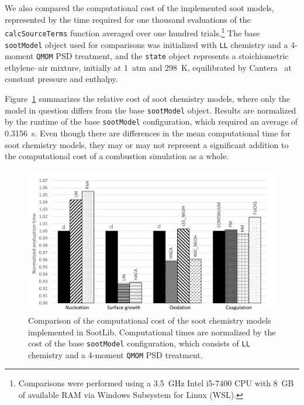 \documentclass[preprint,letterpaper]{elsarticle}
\begin{document}
We also compared the computational cost of the implemented soot models, represented by the time required for one thousand evaluations of the \texttt{calcSourceTerms} function averaged over one hundred trials.\footnote{Comparisons were performed using a 3.5~\si{GHz} Intel i5-7400 CPU with 8~\si{GB} of available RAM via Windows Subsystem for Linux (WSL).} The base \texttt{sootModel} object used for comparisons was initialized with \texttt{LL} chemistry and a 4-moment \texttt{QMOM} PSD treatment, and the \texttt{state} object represents a stoichiometric ethylene--air mixture, initially at 1~\si{atm} and 298~\si{K}, equilibrated by Cantera~\cite{Goodwin_2018} at constant pressure and enthalpy.

Figure~\ref{f:cost_chem} summarizes the relative cost of soot chemistry models, where only the model in question differs from the base \texttt{sootModel} object. Results are normalized by the runtime of the base \texttt{sootModel} configuration, which required an average of 0.3156~\si{s}.
Even though there are differences in the mean computational time for soot chemistry models, they may or may not represent a significant addition to the computational cost of a combustion simulation as a whole.
%
\begin{figure}
    \begin{center}
        \includegraphics[width=\textwidth]{../figures/comp_cost_chem}
    \end{center}
    \caption{Comparison of the computational cost of the soot chemistry models implemented in SootLib. Computational times are normalized by the cost of the base \texttt{sootModel} configuration, which consists of \texttt{LL} chemistry and a 4-moment \texttt{QMOM} PSD treatment.}
    \label{f:cost_chem}
\end{figure}
%
\end{document}
